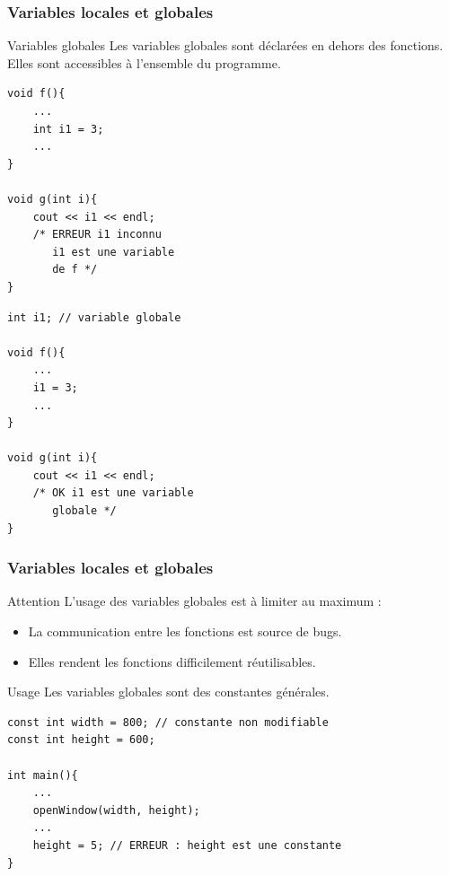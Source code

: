 \begin{frame}[fragile]
	\frametitle{Variables locales et globales}

	\begin{block}{Variables globales}
		Les variables globales sont déclarées en dehors des fonctions.
		Elles sont accessibles à l'ensemble du programme.
	\end{block}

	\begin{minipage}{0.47\linewidth}
		\begin{verbatim}
void f(){
    ...
    int i1 = 3;
    ...
}

void g(int i){
    cout << i1 << endl;
    /* ERREUR i1 inconnu
       i1 est une variable
       de f */
}
		\end{verbatim}
	\end{minipage}
	\hfill
	\begin{minipage}{0.47\linewidth}

		\begin{verbatim}
int i1; // variable globale

void f(){
    ...
    i1 = 3;
    ...
}

void g(int i){
    cout << i1 << endl;
    /* OK i1 est une variable
       globale */
}
		\end{verbatim}
	\end{minipage}

\end{frame}


\begin{frame}[fragile]
	\frametitle{Variables locales et globales}

\begin{alertblock}{Attention}
	L'usage des variables globales est à limiter au maximum :
	\begin{itemize}
		\item La communication entre les fonctions est source de bugs.
		\item Elles rendent les fonctions difficilement réutilisables.
	\end{itemize}
\end{alertblock}

\begin{block}{Usage}
	Les variables globales sont des constantes générales.
\end{block}

\begin{verbatim}
const int width = 800; // constante non modifiable
const int height = 600;

int main(){
    ...
    openWindow(width, height);
    ...
    height = 5; // ERREUR : height est une constante
}
\end{verbatim}

\end{frame}


